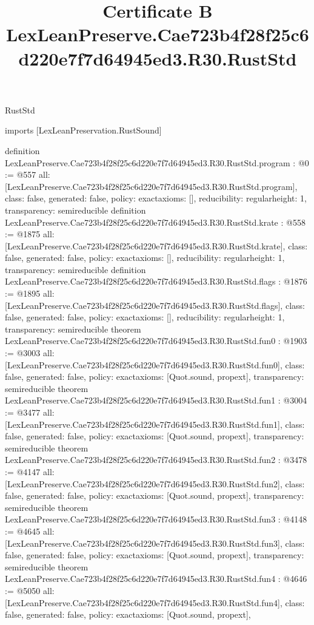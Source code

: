 \begin{lexlean}{RustStd}
\title{Certificate B LexLeanPreserve.Cae723b4f28f25c6d220e7f7d64945ed3.R30.RustStd}
\begin{coremodule}
imports [LexLeanPreservation.RustSound]

definition LexLeanPreserve.Cae723b4f28f25c6d220e7f7d64945ed3.R30.RustStd.program : @0 := @557 {
  all: [LexLeanPreserve.Cae723b4f28f25c6d220e7f7d64945ed3.R30.RustStd.program],
  class: false,
  generated: false,
  policy: exact{axioms: []},
  reducibility: regular{height: 1},
  transparency: semireducible
}
definition LexLeanPreserve.Cae723b4f28f25c6d220e7f7d64945ed3.R30.RustStd.krate : @558 := @1875 {
  all: [LexLeanPreserve.Cae723b4f28f25c6d220e7f7d64945ed3.R30.RustStd.krate],
  class: false,
  generated: false,
  policy: exact{axioms: []},
  reducibility: regular{height: 1},
  transparency: semireducible
}
definition LexLeanPreserve.Cae723b4f28f25c6d220e7f7d64945ed3.R30.RustStd.flags : @1876 := @1895 {
  all: [LexLeanPreserve.Cae723b4f28f25c6d220e7f7d64945ed3.R30.RustStd.flags],
  class: false,
  generated: false,
  policy: exact{axioms: []},
  reducibility: regular{height: 1},
  transparency: semireducible
}
theorem LexLeanPreserve.Cae723b4f28f25c6d220e7f7d64945ed3.R30.RustStd.fun0 : @1903 := @3003 {
  all: [LexLeanPreserve.Cae723b4f28f25c6d220e7f7d64945ed3.R30.RustStd.fun0],
  class: false,
  generated: false,
  policy: exact{axioms: [Quot.sound, propext]},
  transparency: semireducible
}
theorem LexLeanPreserve.Cae723b4f28f25c6d220e7f7d64945ed3.R30.RustStd.fun1 : @3004 := @3477 {
  all: [LexLeanPreserve.Cae723b4f28f25c6d220e7f7d64945ed3.R30.RustStd.fun1],
  class: false,
  generated: false,
  policy: exact{axioms: [Quot.sound, propext]},
  transparency: semireducible
}
theorem LexLeanPreserve.Cae723b4f28f25c6d220e7f7d64945ed3.R30.RustStd.fun2 : @3478 := @4147 {
  all: [LexLeanPreserve.Cae723b4f28f25c6d220e7f7d64945ed3.R30.RustStd.fun2],
  class: false,
  generated: false,
  policy: exact{axioms: [Quot.sound, propext]},
  transparency: semireducible
}
theorem LexLeanPreserve.Cae723b4f28f25c6d220e7f7d64945ed3.R30.RustStd.fun3 : @4148 := @4645 {
  all: [LexLeanPreserve.Cae723b4f28f25c6d220e7f7d64945ed3.R30.RustStd.fun3],
  class: false,
  generated: false,
  policy: exact{axioms: [Quot.sound, propext]},
  transparency: semireducible
}
theorem LexLeanPreserve.Cae723b4f28f25c6d220e7f7d64945ed3.R30.RustStd.fun4 : @4646 := @5050 {
  all: [LexLeanPreserve.Cae723b4f28f25c6d220e7f7d64945ed3.R30.RustStd.fun4],
  class: false,
  generated: false,
  policy: exact{axioms: [Quot.sound, propext]},
}
\end{coremodule}
\end{lexlean}
